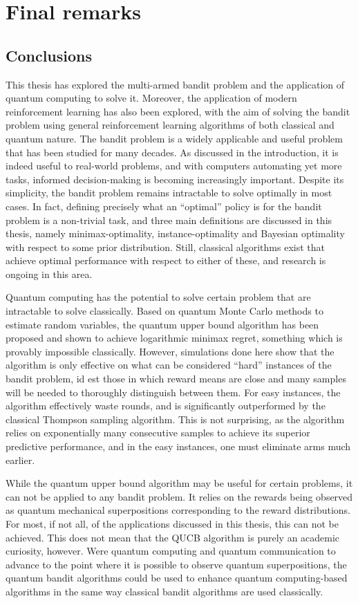 \chapter{Final remarks}
\label{chap:final}

\section{Conclusions}
This thesis has explored the multi-armed bandit problem and the application of quantum computing to solve it.
Moreover, the application of modern reinforcement learning has also been explored, with the aim of solving the bandit problem using general reinforcement learning algorithms of both classical and quantum nature.
The bandit problem is a widely applicable and useful problem that has been studied for many decades.
As discussed in the introduction, it is indeed useful to real-world problems, and with computers automating yet more tasks, informed decision-making is becoming increasingly important.
Despite its simplicity, the bandit problem remains intractable to solve optimally in most cases.
In fact, defining precisely what an \enquote{optimal} policy is for the bandit problem is a non-trivial task, and three main definitions are discussed in this thesis, namely minimax-optimality, instance-optimality and Bayesian optimality with respect to some prior distribution.
Still, classical algorithms exist that achieve optimal performance with respect to either of these, and research is ongoing in this area.

Quantum computing has the potential to solve certain problem that are intractable to solve classically.
Based on quantum Monte Carlo methods to estimate random variables, the quantum upper bound algorithm has been proposed and shown to achieve logarithmic minimax regret, something which is provably impossible classically.
However, simulations done here show that the algorithm is only effective on what can be considered \enquote{hard} instances of the bandit problem, id est those in which reward means are close and many samples will be needed to thoroughly distinguish between them.
For easy instances, the algorithm effectively waste rounds, and is significantly outperformed by the classical Thompson sampling algorithm.
This is not surprising, as the algorithm relies on exponentially many consecutive samples to achieve its superior predictive performance, and in the easy instances, one must eliminate arms much earlier.

While the quantum upper bound algorithm may be useful for certain problems, it can not be applied to any bandit problem.
It relies on the rewards being observed as quantum mechanical superpositions corresponding to the reward distributions.
For most, if not all, of the applications discussed in this thesis, this can not be achieved.
This does not mean that the QUCB algorithm is purely an academic curiosity, however.
Were quantum computing and quantum communication to advance to the point where it is possible to observe quantum superpositions, the quantum bandit algorithms could be used to enhance quantum computing-based algorithms in the same way classical bandit algorithms are used classically.

